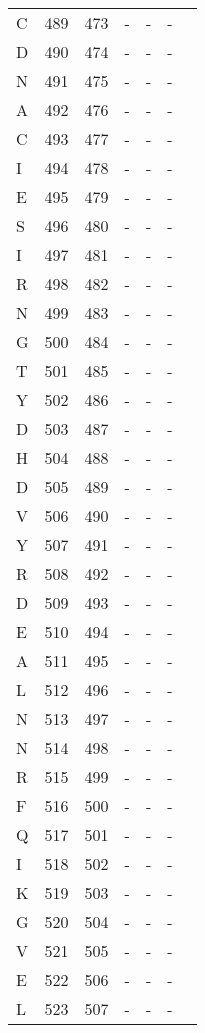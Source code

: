 \begin{longtable}{lllllll}
  C & 489 & 473 & - & - & - &  \\ 
  D & 490 & 474 & - & - & - &  \\ 
  N & 491 & 475 & - & - & - &  \\ 
  A & 492 & 476 & - & - & - &  \\ 
  C & 493 & 477 & - & - & - &  \\ 
  I & 494 & 478 & - & - & - &  \\ 
  E & 495 & 479 & - & - & - &  \\ 
  S & 496 & 480 & - & - & - &  \\ 
  I & 497 & 481 & - & - & - &  \\ 
  R & 498 & 482 & - & - & - &  \\ 
  N & 499 & 483 & - & - & - &  \\ 
  G & 500 & 484 & - & - & - &  \\ 
  T & 501 & 485 & - & - & - &  \\ 
  Y & 502 & 486 & - & - & - &  \\ 
  D & 503 & 487 & - & - & - &  \\ 
  H & 504 & 488 & - & - & - &  \\ 
  D & 505 & 489 & - & - & - &  \\ 
  V & 506 & 490 & - & - & - &  \\ 
  Y & 507 & 491 & - & - & - &  \\ 
  R & 508 & 492 & - & - & - &  \\ 
  D & 509 & 493 & - & - & - &  \\ 
  E & 510 & 494 & - & - & - &  \\ 
  A & 511 & 495 & - & - & - &  \\ 
  L & 512 & 496 & - & - & - &  \\ 
  N & 513 & 497 & - & - & - &  \\ 
  N & 514 & 498 & - & - & - &  \\ 
  R & 515 & 499 & - & - & - &  \\ 
  F & 516 & 500 & - & - & - &  \\ 
  Q & 517 & 501 & - & - & - &  \\ 
  I & 518 & 502 & - & - & - &  \\ 
  K & 519 & 503 & - & - & - &  \\ 
  G & 520 & 504 & - & - & - &  \\ 
  V & 521 & 505 & - & - & - &  \\ 
  E & 522 & 506 & - & - & - &  \\ 
  L & 523 & 507 & - & - & - &  \\ 

\end{longtable}
